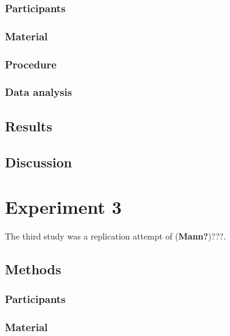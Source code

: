 \documentclass[
  english,
  man]{apa6}
\begin{document}
\hypertarget{participants-1}{%
\subsubsection{Participants}\label{participants-1}}

\hypertarget{material}{%
\subsubsection{Material}\label{material}}

\hypertarget{procedure-1}{%
\subsubsection{Procedure}\label{procedure-1}}

\hypertarget{data-analysis}{%
\subsubsection{Data analysis}\label{data-analysis}}

\hypertarget{results-1}{%
\subsection{Results}\label{results-1}}

\hypertarget{discussion-1}{%
\subsection{Discussion}\label{discussion-1}}

\hypertarget{experiment-3}{%
\section{Experiment 3}\label{experiment-3}}

The third study was a replication attempt of (\textbf{Mann?})???.

\hypertarget{methods-2}{%
\subsection{Methods}\label{methods-2}}

\hypertarget{participants-2}{%
\subsubsection{Participants}\label{participants-2}}

\hypertarget{material-1}{%
\subsubsection{Material}\label{material-1}}
\end{document}
